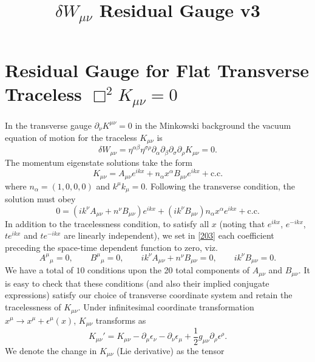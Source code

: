 \documentclass[10pt,letterpaper]{article}
\title{$\delta W_{\mu\nu}$ Residual Gauge v3}
\author{}
\date{}
\begin{document}
\maketitle
\section*{Residual Gauge for Flat Transverse Traceless $\Box^2 K_{\mu\nu}=0$}
In the transverse gauge $\partial_\nu K^{\mu\nu} = 0$ in the Minkowski background the vacuum equation of motion for the traceless $K_{\mu\nu}$ is
\begin{equation}
\delta W_{\mu\nu} = \eta^{\alpha\beta} \eta^{\sigma\rho}\partial_\alpha\partial_\beta\partial_\sigma\partial_\rho K_{\mu\nu} =0.
\end{equation}
The momentum eigenstate solutions take the form 
\begin{equation}
K_{\mu\nu} = A_{\mu\nu}e^{ikx} + n_\alpha x^\alpha B_{\mu\nu} e^{ikx} +\text{c.c.}\label{202}
\end{equation}
where $n_\alpha = (1,0,0,0)$ and $k^\mu k_{\mu} = 0$. Following the transverse condition, the solution must obey
\begin{equation}
0=\left(ik^\nu A_{\mu\nu} + n^\nu B_{\mu\nu}\right)e^{ikx}
+ \left( ik^\nu B_{\mu\nu}\right) n_\alpha x^\alpha  e^{ikx}+ \text{c.c.}\label{203}
\end{equation}
In addition to the tracelessness condition, to satisfy all $x$ (noting that $e^{ikx}$, $e^{-ikx}$, $te^{ikx}$ and $te^{-ikx}$ are linearly independent), we set in \eqref{203} each coefficient preceding the space-time dependent function to zero, viz.
\begin{equation}
A^\mu{}_\mu = 0,\qquad B^\mu{}_\mu=0,\qquad ik^\nu A_{\mu\nu} + n^\nu B_{\mu\nu}= 0,\qquad i k^\nu B_{\mu\nu} = 0.
\end{equation}
We have a total of $10$ conditions upon the 20 total components of $A_{\mu\nu}$ and $B_{\mu\nu}$. 
It is easy to check that these conditions (and also their implied conjugate expressions) satisfy our choice of transverse coordinate system and retain the tracelessness of $K_{\mu\nu}$. 
Under infinitesimal coordinate transformation $x^\mu \to x^\mu + \epsilon^\mu(x)$, $K_{\mu\nu}$ transforms as
\begin{equation}
	K_{\mu\nu}' = K_{\mu\nu} - \partial_\mu \epsilon_\nu - \partial_\nu\epsilon_\mu + \frac12 g_{\mu\nu} \partial_\rho \epsilon^\rho.
\end{equation}
We denote the change in $K_{\mu\nu}$ (Lie derivative) as the tensor
\end{document}
